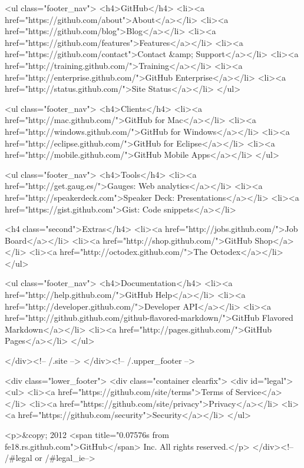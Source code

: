        <ul class="footer_nav">
         <h4>GitHub</h4>
         <li><a href="https://github.com/about">About</a></li>
         <li><a href="https://github.com/blog">Blog</a></li>
         <li><a href="https://github.com/features">Features</a></li>
         <li><a href="https://github.com/contact">Contact &amp; Support</a></li>
         <li><a href="http://training.github.com/">Training</a></li>
         <li><a href="http://enterprise.github.com/">GitHub Enterprise</a></li>
         <li><a href="http://status.github.com/">Site Status</a></li>
       </ul>

       <ul class="footer_nav">
         <h4>Clients</h4>
         <li><a href="http://mac.github.com/">GitHub for Mac</a></li>
         <li><a href="http://windows.github.com/">GitHub for Windows</a></li>
         <li><a href="http://eclipse.github.com/">GitHub for Eclipse</a></li>
         <li><a href="http://mobile.github.com/">GitHub Mobile Apps</a></li>
       </ul>

       <ul class="footer_nav">
         <h4>Tools</h4>
         <li><a href="http://get.gaug.es/">Gauges: Web analytics</a></li>
         <li><a href="http://speakerdeck.com">Speaker Deck: Presentations</a></li>
         <li><a href="https://gist.github.com">Gist: Code snippets</a></li>

         <h4 class="second">Extras</h4>
         <li><a href="http://jobs.github.com/">Job Board</a></li>
         <li><a href="http://shop.github.com/">GitHub Shop</a></li>
         <li><a href="http://octodex.github.com/">The Octodex</a></li>
       </ul>

       <ul class="footer_nav">
         <h4>Documentation</h4>
         <li><a href="http://help.github.com/">GitHub Help</a></li>
         <li><a href="http://developer.github.com/">Developer API</a></li>
         <li><a href="http://github.github.com/github-flavored-markdown/">GitHub Flavored Markdown</a></li>
         <li><a href="http://pages.github.com/">GitHub Pages</a></li>
       </ul>

     </div><!-- /.site -->
  </div><!-- /.upper_footer -->

<div class="lower_footer">
  <div class="container clearfix">
    <div id="legal">
      <ul>
          <li><a href="https://github.com/site/terms">Terms of Service</a></li>
          <li><a href="https://github.com/site/privacy">Privacy</a></li>
          <li><a href="https://github.com/security">Security</a></li>
      </ul>

      <p>&copy; 2012 <span title="0.07576s from fe18.rs.github.com">GitHub</span> Inc. All rights reserved.</p>
    </div><!-- /#legal or /#legal_ie-->

